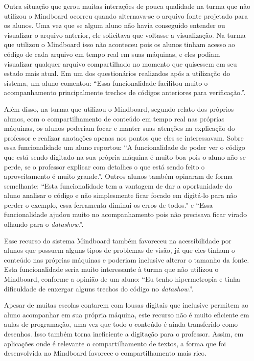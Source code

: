 Outra situação que gerou muitas interações de pouca qualidade na turma que não utilizou o Mindboard ocorreu quando alternava-se o arquivo fonte projetado para os alunos. Uma vez que se algum aluno não havia conseguido entender ou visualizar o arquivo anterior, ele solicitava que voltasse a visualização. Na turma que utilizou o Mindboard isso não aconteceu pois os alunos tinham acesso ao código de cada arquivo em tempo real em suas máquinas, e eles podiam visualizar qualquer arquivo compartilhado no momento que quisessem em seu estado mais atual. Em um dos questionários realizados após a utilização do sistema, um aluno comentou: ``Essa funcionalidade facilitou muito o acompanhamento principalmente trechos de códigos anteriores para verificação.''.

Além disso, na turma que utilizou o Mindboard, segundo relato dos próprios alunos, com o compartilhamento de conteúdo em tempo real nas próprias máquinas, os alunos poderiam focar e manter suas atenções na explicação do professor e realizar anotações apenas nos pontos que eles se interessavam. Sobre essa funcionalidade um aluno reportou: ``A funcionalidade de poder ver o código que está sendo digitado na sua própria máquina é muito boa pois o aluno não se perde, se o professor explicar com detalhes o que está sendo feito o aproveitamento é muito grande.''. Outros alunos também opinaram de forma semelhante: ``Esta funcionalidade tem a vantagem de dar a oportunidade do aluno analisar o código e não simplesmente ficar focado em digitá-lo para não perder o exemplo, essa ferramenta diminui os erros de todos.'' e ``Essa funcionalidade ajudou muito no acompanhamento pois não precisava ficar virado olhando para o \emph{datashow}.''.

Esse recurso do sistema Mindboard também favoreceu na acessibilidade por alunos que possuem alguns tipos de problemas de visão, já que eles tinham o conteúdo nas próprias máquinas e poderiam inclusive alterar o tamanho da fonte. Esta funcionalidade seria muito interessante à turma que não utilizou o Mindboard, conforme a opinião de um aluno: ``Eu tenho hipermetropia e tinha dificuldade de enxergar alguns trechos do código no \emph{datashow}.''.

Apesar de muitas escolas contarem com lousas digitais que inclusive permitem ao aluno acompanhar em sua própria máquina, este recurso não é muito eficiente em aulas de programação, uma vez que todo o conteúdo é ainda transferido como desenhos. Isso também torna ineficiente a digitação para o professor. Assim, em aplicações onde é relevante o compartilhamento de textos, a forma que foi desenvolvida no Mindboard favorece o compartilhamento mais rico.

